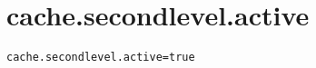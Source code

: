 \section{cache.secondlevel.active}
\label{configuration:CacheSecondlevelActive}
\AvailableInJavaAndCsharp{\TODO}
\begin{lstlisting}[style=Props,caption={Usage example for \textit{cache.secondlevel.active}}]
cache.secondlevel.active=true
\end{lstlisting}